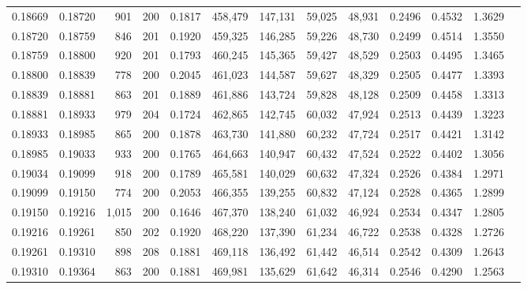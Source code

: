 \begin{tabular}{rrrrrrrrrrrrr}
0.18669 & 0.18720 &   901 & 200 &                                     0.1817 & 458,479 & 147,131 &  59,025 &  48,931 & 0.2496 & 0.4532 & 1.3629 \\
0.18720 & 0.18759 &   846 & 201 &                                     0.1920 & 459,325 & 146,285 &  59,226 &  48,730 & 0.2499 & 0.4514 & 1.3550 \\
0.18759 & 0.18800 &   920 & 201 &                                     0.1793 & 460,245 & 145,365 &  59,427 &  48,529 & 0.2503 & 0.4495 & 1.3465 \\
0.18800 & 0.18839 &   778 & 200 &                                     0.2045 & 461,023 & 144,587 &  59,627 &  48,329 & 0.2505 & 0.4477 & 1.3393 \\
0.18839 & 0.18881 &   863 & 201 &                                     0.1889 & 461,886 & 143,724 &  59,828 &  48,128 & 0.2509 & 0.4458 & 1.3313 \\
0.18881 & 0.18933 &   979 & 204 &                                     0.1724 & 462,865 & 142,745 &  60,032 &  47,924 & 0.2513 & 0.4439 & 1.3223 \\
0.18933 & 0.18985 &   865 & 200 &                                     0.1878 & 463,730 & 141,880 &  60,232 &  47,724 & 0.2517 & 0.4421 & 1.3142 \\
0.18985 & 0.19033 &   933 & 200 &                                     0.1765 & 464,663 & 140,947 &  60,432 &  47,524 & 0.2522 & 0.4402 & 1.3056 \\
0.19034 & 0.19099 &   918 & 200 &                                     0.1789 & 465,581 & 140,029 &  60,632 &  47,324 & 0.2526 & 0.4384 & 1.2971 \\
0.19099 & 0.19150 &   774 & 200 &                                     0.2053 & 466,355 & 139,255 &  60,832 &  47,124 & 0.2528 & 0.4365 & 1.2899 \\
0.19150 & 0.19216 & 1,015 & 200 &                                     0.1646 & 467,370 & 138,240 &  61,032 &  46,924 & 0.2534 & 0.4347 & 1.2805 \\
0.19216 & 0.19261 &   850 & 202 &                                     0.1920 & 468,220 & 137,390 &  61,234 &  46,722 & 0.2538 & 0.4328 & 1.2726 \\
0.19261 & 0.19310 &   898 & 208 &                                     0.1881 & 469,118 & 136,492 &  61,442 &  46,514 & 0.2542 & 0.4309 & 1.2643 \\
0.19310 & 0.19364 &   863 & 200 &                                     0.1881 & 469,981 & 135,629 &  61,642 &  46,314 & 0.2546 & 0.4290 & 1.2563 \\

\end{tabular}
